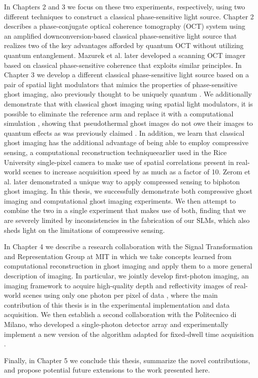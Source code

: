 In Chapters 2 and 3 we focus on these two experiments, respectively, using two different techniques to construct a classical phase-sensitive light source. Chapter 2 describes a phase-conjugate optical coherence tomography (OCT) system \cite{legouet-experimental} using an amplified downconversion-based classical phase-sensitive light source that realizes two of the key advantages afforded by quantum OCT \cite{lavoie-quantum} without utilizing quantum entanglement. Mazurek et al. \cite{mazurek-dispersion} later developed a scanning OCT imager based on classical phase-sensitive coherence that exploits similar principles. In Chapter 3 we develop a different classical phase-sensitive light source based on a pair of spatial light modulators \cite{venkatraman-classical} that mimics the properties of phase-sensitive ghost imaging, also previously thought to be uniquely quantum \cite{pittman-ghost}. We additionally demonstrate that with classical ghost imaging using spatial light modulators, it is possible to eliminate the reference arm and replace it with a computational simulation \cite{shapiro-discord}, showing that pseudothermal ghost images do not owe their images to quantum effects as was previously claimed \cite{ragy-nature}. In addition, we learn that classical ghost imaging has the additional advantage of being able to employ compressive sensing, a computational reconstruction techniqueearlier used in the Rice University single-pixel camera \cite{takhar-new,duarte-single} to make use of spatial correlations present in real-world scenes to increase acquisition speed by as much as a factor of 10. Zerom et al. \cite{zerom-entangled} later demonstrated a unique way to apply compressed sensing to biphoton ghost imaging. In this thesis, we successfully demonstrate both compressive ghost imaging and computational ghost imaging experiments. We then attempt to combine the two in a single experiment that makes use of both, finding that we are severely limited by inconsistencies in the fabrication of our SLMs, which also sheds light on the limitations of compressive sensing.

In Chapter 4 we describe a research collaboration with the Signal Transformation and Representation Group at MIT in which we take concepts learned from computational reconstruction in ghost imaging and apply them to a more general description of imaging. In particular, we jointly develop first-photon imaging, an imaging framework to acquire high-quality depth and reflectivity images of real-world scenes using only one photon per pixel of data \cite{kirmani-first}, where the main contribution of this thesis is in the experimental implementation and data acquisition. We then establish a second collaboration with the Politecnico di Milano, who developed a single-photon detector array \cite{villa-spad,scarcella-low} and experimentally implement a new version of the algorithm adapted for fixed-dwell time acquisition \cite{kirmani-photon}.

Finally, in Chapter 5 we conclude this thesis, summarize the novel contributions, and propose potential future extensions to the work presented here.
